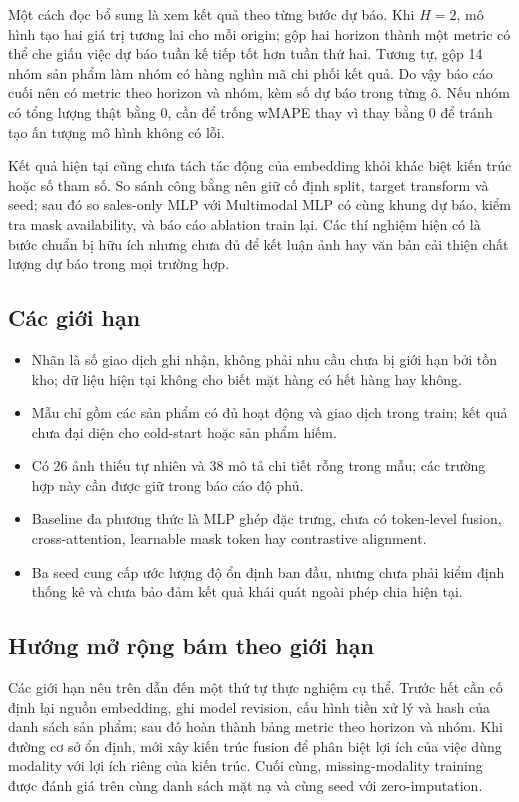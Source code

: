 \documentclass[12pt,a4paper,oneside]{article}
\begin{document}
Một cách đọc bổ sung là xem kết quả theo từng bước dự báo. Khi $H=2$, mô hình tạo hai giá trị tương lai cho mỗi origin; gộp hai horizon thành một metric có thể che giấu việc dự báo tuần kế tiếp tốt hơn tuần thứ hai. Tương tự, gộp 14 nhóm sản phẩm làm nhóm có hàng nghìn mã chi phối kết quả. Do vậy báo cáo cuối nên có metric theo horizon và nhóm, kèm số dự báo trong từng ô. Nếu nhóm có tổng lượng thật bằng 0, cần để trống wMAPE thay vì thay bằng 0 để tránh tạo ấn tượng mô hình không có lỗi.

Kết quả hiện tại cũng chưa tách tác động của embedding khỏi khác biệt kiến trúc hoặc số tham số. So sánh công bằng nên giữ cố định split, target transform và seed; sau đó so sales-only MLP với Multimodal MLP có cùng khung dự báo, kiểm tra mask availability, và báo cáo ablation train lại. Các thí nghiệm hiện có là bước chuẩn bị hữu ích nhưng chưa đủ để kết luận ảnh hay văn bản cải thiện chất lượng dự báo trong mọi trường hợp.

\subsection{Các giới hạn}
\begin{itemize}
  \item Nhãn là số giao dịch ghi nhận, không phải nhu cầu chưa bị giới hạn bởi tồn kho; dữ liệu hiện tại không cho biết mặt hàng có hết hàng hay không.
  \item Mẫu chỉ gồm các sản phẩm có đủ hoạt động và giao dịch trong train; kết quả chưa đại diện cho cold-start hoặc sản phẩm hiếm.
  \item Có 26 ảnh thiếu tự nhiên và 38 mô tả chi tiết rỗng trong mẫu; các trường hợp này cần được giữ trong báo cáo độ phủ.
  \item Baseline đa phương thức là MLP ghép đặc trưng, chưa có token-level fusion, cross-attention, learnable mask token hay contrastive alignment.
  \item Ba seed cung cấp ước lượng độ ổn định ban đầu, nhưng chưa phải kiểm định thống kê và chưa bảo đảm kết quả khái quát ngoài phép chia hiện tại.
\end{itemize}

\subsection{Hướng mở rộng bám theo giới hạn}
Các giới hạn nêu trên dẫn đến một thứ tự thực nghiệm cụ thể. Trước hết cần cố định lại nguồn embedding, ghi model revision, cấu hình tiền xử lý và hash của danh sách sản phẩm; sau đó hoàn thành bảng metric theo horizon và nhóm. Khi đường cơ sở ổn định, mới xây kiến trúc fusion để phân biệt lợi ích của việc dùng modality với lợi ích riêng của kiến trúc. Cuối cùng, missing-modality training được đánh giá trên cùng danh sách mặt nạ và cùng seed với zero-imputation.
\end{document}
